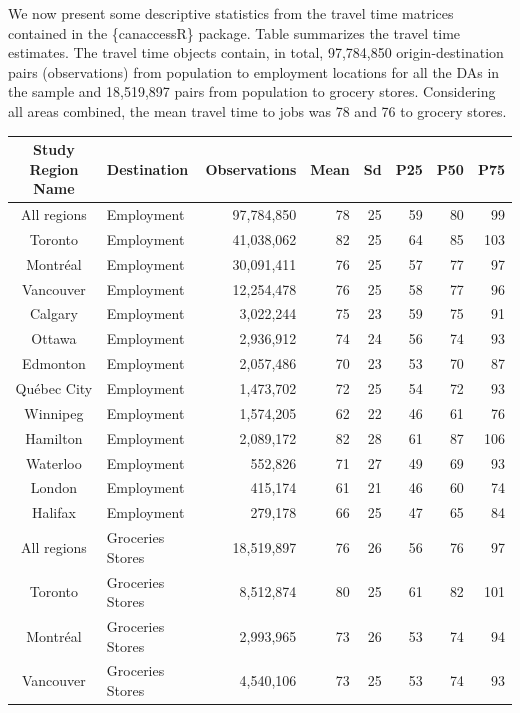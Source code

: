\documentclass[Royal,times,sageh]{sagej}
\begin{document}
We now present some descriptive statistics from the travel time matrices
contained in the \{canaccessR\} package. Table \citet{tbl-table_1}
summarizes the travel time estimates. The travel time objects contain,
in total, 97,784,850 origin-destination pairs (observations) from
population to employment locations for all the DAs in the sample and
18,519,897 pairs from population to grocery stores. Considering all
areas combined, the mean travel time to jobs was 78 and 76 to grocery
stores.

\begin{table}[t]
\fontsize{7.5pt}{9.0pt}\selectfont
\begin{tabular*}{1\linewidth}{@{\extracolsep{\fill}}clrrrrrr}
\toprule
Study Region Name & Destination & Observations & Mean & Sd & P25 & P50 & P75 \\ 
\midrule\addlinespace[2.5pt]
All regions & Employment & 97,784,850 & 78 & 25 & 59 & 80 & 99 \\ 
Toronto & Employment & 41,038,062 & 82 & 25 & 64 & 85 & 103 \\ 
Montréal & Employment & 30,091,411 & 76 & 25 & 57 & 77 & 97 \\ 
Vancouver & Employment & 12,254,478 & 76 & 25 & 58 & 77 & 96 \\ 
Calgary & Employment & 3,022,244 & 75 & 23 & 59 & 75 & 91 \\ 
Ottawa & Employment & 2,936,912 & 74 & 24 & 56 & 74 & 93 \\ 
Edmonton & Employment & 2,057,486 & 70 & 23 & 53 & 70 & 87 \\ 
Québec City & Employment & 1,473,702 & 72 & 25 & 54 & 72 & 93 \\ 
Winnipeg & Employment & 1,574,205 & 62 & 22 & 46 & 61 & 76 \\ 
Hamilton & Employment & 2,089,172 & 82 & 28 & 61 & 87 & 106 \\ 
Waterloo & Employment & 552,826 & 71 & 27 & 49 & 69 & 93 \\ 
London & Employment & 415,174 & 61 & 21 & 46 & 60 & 74 \\ 
Halifax & Employment & 279,178 & 66 & 25 & 47 & 65 & 84 \\ 
All regions & Groceries Stores & 18,519,897 & 76 & 26 & 56 & 76 & 97 \\ 
Toronto & Groceries Stores & 8,512,874 & 80 & 25 & 61 & 82 & 101 \\ 
Montréal & Groceries Stores & 2,993,965 & 73 & 26 & 53 & 74 & 94 \\ 
Vancouver & Groceries Stores & 4,540,106 & 73 & 25 & 53 & 74 & 93 \\ 

\end{tabular*}
\end{table}
\end{document}
